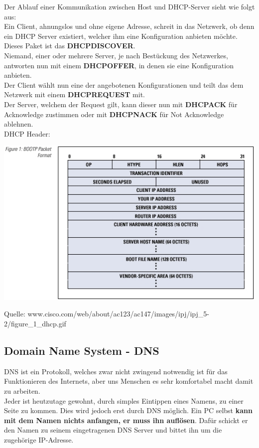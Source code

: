 \documentclass[12pt,a4paper]{report}
\begin{document}
\begin{onehalfspace}
Der Ablauf einer Kommunikation zwischen Host und DHCP-Server sieht wie folgt aus:\\
Ein Client, ahnungslos und ohne eigene Adresse, schreit in das Netzwerk, ob denn ein DHCP Server existiert, welcher ihm eine Konfiguration anbieten möchte. Dieses Paket ist das \textbf{DHCPDISCOVER}.\\
Niemand, einer oder mehrere Server, je nach Bestückung des Netzwerkes, antworten nun mit einem \textbf{DHCPOFFER}, in denen sie eine Konfiguration anbieten.\\
Der Client wählt nun eine der angebotenen Konfigurationen und teilt das dem Netzwerk mit einem \textbf{DHCPREQUEST} mit.\\
Der Server, welchem der Request gilt, kann dieser nun mit \textbf{DHCPACK} für Acknowledge zustimmen oder mit \textbf{DHCPNACK} für Not Acknowledge ablehnen.\\

DHCP Header:\\
\begin{center}
\includegraphics[scale=0.7]{../docs/tarkes/pics/dhcpheader.jpg}
\begin{scriptsize}
Quelle: www.cisco.com/web/about/ac123/ac147/images/ipj/ipj\_5-2/figure\_1\_dhcp.gif
\end{scriptsize}
\end{center}
\subsection{Domain Name System - DNS} \label{ssec:DNS}
DNS ist ein Protokoll, welches zwar nicht zwingend notwendig ist für das Funktionieren des Internets, aber uns Menschen es sehr komfortabel macht damit zu arbeiten.\\
Jeder ist heutzutage gewohnt, durch simples Eintippen eines Namens, zu einer Seite zu kommen. Dies wird jedoch erst durch DNS möglich. Ein PC selbst \textbf{kann mit dem Namen nichts anfangen, er muss ihn auflösen}. Dafür schickt er den Namen zu seinem eingetragenen DNS Server und bittet ihn um die zugehörige IP-Adresse.\\


\end{onehalfspace}
\end{document}
